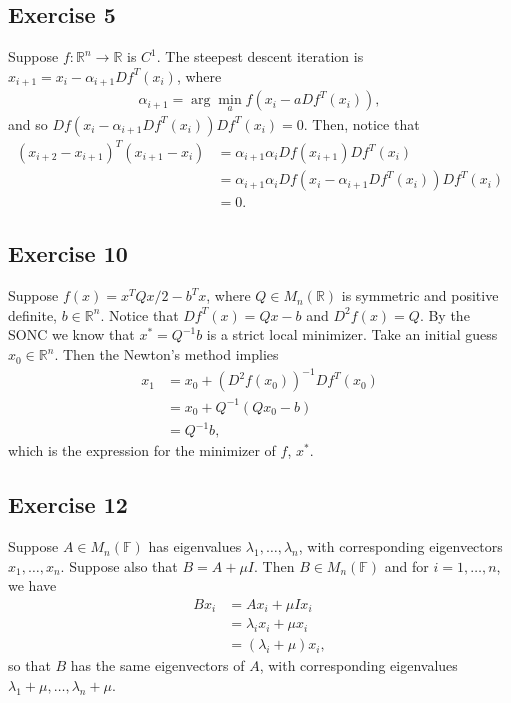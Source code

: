 \documentclass[11.5pt, letterpaper, bibtotoc,
    tablecaptionabove, figurecaptionabove]{article}
\begin{document}
\subsection*{Exercise 5}
Suppose $f:\mathbb R^n\to\mathbb R$ is $C^1$.
The steepest descent iteration is $x_{i+1}=x_i-\alpha_{i+1}Df^T(x_i)$, where
\begin{align*}
    \alpha_{i+1}=\arg \min_a f(x_i-aDf^T(x_i)),
\end{align*}
and so $Df(x_i-\alpha_{i+1}Df^T(x_i))Df^T(x_i)=0$.
Then, notice that
\begin{align*}
    (x_{i+2}-x_{i+1})^T(x_{i+1}-x_i)&=\alpha_{i+1}\alpha_iDf(x_{i+1})Df^T(x_i)\\
    &=\alpha_{i+1}\alpha_iDf(x_i-\alpha_{i+1}Df^T(x_i))Df^T(x_i)\\
    &=0.
\end{align*}

\subsection*{Exercise 10}
Suppose $f(x)=x^TQx/2-b^Tx$, where $Q\in M_n(\mathbb R)$
is symmetric and positive definite, $b\in\mathbb R^n$.
Notice that $Df^T(x)=Qx-b$ and $D^2f(x)=Q$.
By the SONC we know that $x^*=Q^{-1}b$ is a strict local minimizer.
Take an initial guess $x_0\in\mathbb R^n$.
Then the Newton's method implies
\begin{align*}
    x_1&=x_0+(D^2f(x_0))^{-1}Df^T(x_0)\\
    &=x_0+Q^{-1}(Qx_0-b)\\
    &=Q^{-1}b,
\end{align*}
which is the expression for the minimizer of $f$, $x^*$.

\subsection*{Exercise 12}
Suppose $A\in M_n(\mathbb F)$ has eigenvalues $\lambda_1,\ldots,\lambda_n$,
with corresponding eigenvectors $x_1,\ldots,x_n$.
Suppose also that $B=A+\mu I$.
Then $B\in M_n(\mathbb F)$ and for $i=1,\ldots,n$, we have
\begin{align*}
    Bx_i&=Ax_i+\mu Ix_i\\
    &=\lambda_ix_i+\mu x_i\\
    &=(\lambda_i+\mu)x_i,
\end{align*}
so that $B$ has the same eigenvectors of $A$,
with corresponding eigenvalues $\lambda_1+\mu,\ldots,\lambda_n+\mu$.
\end{document}
